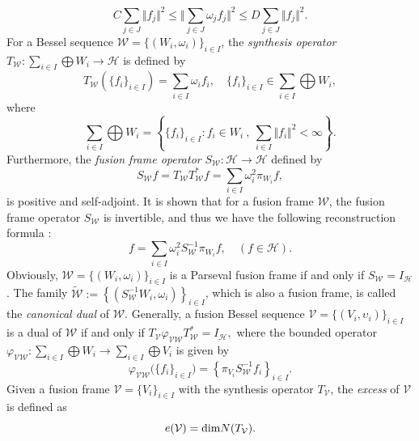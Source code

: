 \documentclass[sn-mathphys-num]{sn-jnl}%
\theoremstyle{definition}
\theoremstyle{remark}
\numberwithin{equation}{section}
\begin{document}
\begin{equation*}\label{fusion Riesz basis}
C \sum _{j \in J}\Vert f_{j} \Vert ^{2} \leq \bigg\Vert \sum _{j \in J} \omega_{j} f_{j}\bigg\Vert ^2 \leq D\sum _{j \in J}\Vert f_{j} \Vert ^{2}.
\end{equation*}
For a Bessel sequence $\mathcal{W}=\{(W_{i},\omega_{i})\}_{i \in I}$, the \textit{synthesis operator} $ T_{\mathcal{W}}: \sum_{i \in I}\bigoplus W_{i} \rightarrow \mathcal {H}$ is defined by 
\begin{equation*}
T_{\mathcal{W}}(\{f_{i}\}_{i \in I})=\sum_{i \in I}\omega_{i}f_{i}, \quad \{f_{i}\}_{i \in I} \in \sum_{i \in I}\bigoplus W_{i},
\end{equation*}
where 
\begin{equation*}
\sum_{i \in I}\bigoplus W_{i}=\left\lbrace \{f_{i}\}_{i \in I}: f_{i}\in W_{i}~,~ \sum_{i \in I}\Vert f_{i} \Vert ^{2}< \infty \right\rbrace.
\end{equation*}
Furthermore, the \textit{fusion frame operator} $S_{\mathcal{W}}:\mathcal {H} \rightarrow \mathcal {H}$ defined by
\begin{equation*}
S_{\mathcal{W}}f=T_{\mathcal{W}}T^{*}_{\mathcal{W}}f=\sum_{i \in I}\omega_{i}^{2}\pi_{W_{i}}f,
\end{equation*}
is positive and self-adjoint. It is shown that for a fusion frame $\mathcal{W}$, the fusion frame operator $S_{\mathcal{W}}$ is invertible, and thus we have the following reconstruction formula \cite{frame of subspace}: 
\begin{equation*}
f=\sum_{i \in I}\omega_{i}^{2}S_{\mathcal{W}}^{-1}\pi_{W_{i}}f, \quad(f \in \mathcal {H}).
\end{equation*}
Obviously, $\mathcal{W}=\{(W_{i},\omega_{i})\}_{i \in I} $ is a Parseval fusion frame if and only if $S_{\mathcal{W}}=I_{\mathcal {H}}$. The family $\widetilde{\mathcal{W}}:=\left\lbrace (S_{\mathcal{W}}^{-1}W_{i},\omega_{i})\right\rbrace _{i \in I}$, which is also a fusion frame, is called the \textit{canonical dual} of $\mathcal{W}$. Generally, a fusion Bessel sequence $\mathcal{V}=\{(V_{i},\upsilon_{i})\}_{i \in I}$ is a dual of $\mathcal{W}$ if and only if \cite{Osgooei}
$T_{\mathcal{V}}\varphi_{\mathcal{VW}} T_{\mathcal{W}}^{*}=I_{\mathcal {H}},$ 
where the bounded operator $\varphi_{\mathcal{VW}}:\sum_{i \in I}\bigoplus W_{i}\rightarrow \sum_{i \in I}\bigoplus V_{i}$ is given by
\begin{equation*}
\varphi_{\mathcal{VW}}\big(\{f_{i}\}_{i \in I}\big)=\left\lbrace \pi_{V_{i}}S_{\mathcal{W}}^{-1}f_{i}\right\rbrace _{i \in I} .
\end{equation*}
Given a fusion frame $\mathcal{V}=\{V_{i}\}_{i \in I} $ with the synthesis operator $T_{\mathcal{V}}$, the \textit{excess} of $\mathcal{V}$ is defined as \cite{Excess 1}
\begin{equation*}
e(\mathcal{V})=\textnormal{dim}N(T_{\mathcal{V}}).
\end{equation*}
\end{document}
